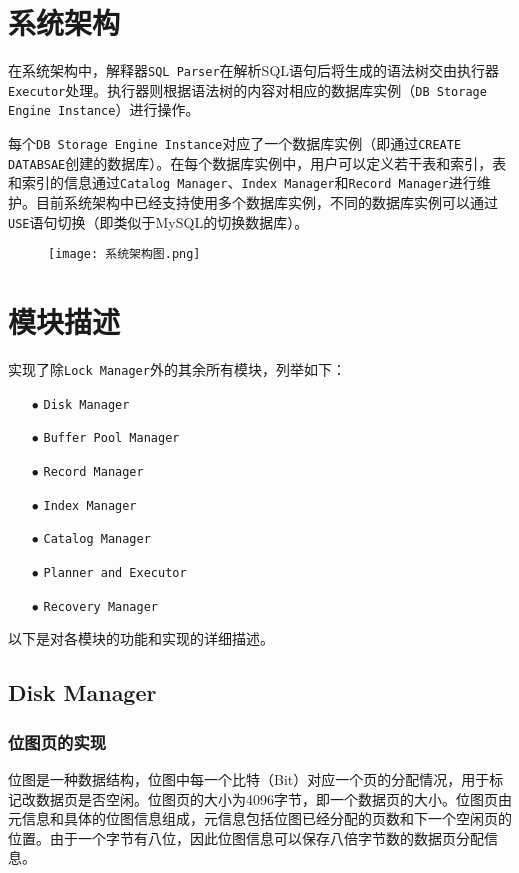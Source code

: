 \documentclass[12pt]{article}
\begin{document}
    \section{系统架构}
    在系统架构中，解释器\texttt{SQL Parser}在解析SQL语句后将生成的语法树交由执行器\texttt{Executor}处理。执行器则根据语法树的内容对相应的数据库实例（\texttt{DB Storage Engine Instance}）进行操作。

    每个\texttt{DB Storage Engine Instance}对应了一个数据库实例（即通过\texttt{CREATE DATABSAE}创建的数据库）。在每个数据库实例中，用户可以定义若干表和索引，表和索引的信息通过\texttt{Catalog Manager}、\texttt{Index Manager}和\texttt{Record Manager}进行维护。目前系统架构中已经支持使用多个数据库实例，不同的数据库实例可以通过\texttt{USE}语句切换（即类似于MySQL的切换数据库）。
    
    \begin{figure}[H]
    \centering
    \texttt{[image: 系统架构图.png]}
    \end{figure}

    \section{模块描述}
    实现了除\texttt{Lock Manager}外的其余所有模块，列举如下：
    \begin{itemize}
        \item[$\bullet$] \texttt{Disk Manager}
        \item[$\bullet$] \texttt{Buffer Pool Manager}
        \item[$\bullet$] \texttt{Record Manager}
        \item[$\bullet$] \texttt{Index Manager}
        \item[$\bullet$] \texttt{Catalog Manager}
        \item[$\bullet$] \texttt{Planner and Executor}
        \item[$\bullet$] \texttt{Recovery Manager}
    \end{itemize}
    以下是对各模块的功能和实现的详细描述。

    \subsection{Disk Manager}
    \subsubsection{位图页的实现}
    位图是一种数据结构，位图中每一个比特（Bit）对应一个页的分配情况，用于标记改数据页是否空闲。位图页的大小为4096字节，即一个数据页的大小。位图页由元信息和具体的位图信息组成，元信息包括位图已经分配的页数和下一个空闲页的位置。由于一个字节有八位，因此位图信息可以保存八倍字节数的数据页分配信息。
\end{document}

